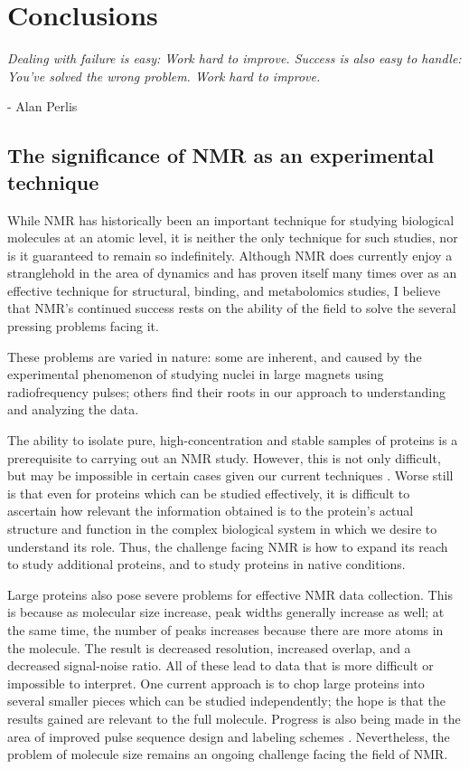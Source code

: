 \chapter{Conclusions}

\begin{center}
  \textit{Dealing with failure is easy: Work hard to improve. Success is also 
    easy to handle: You've solved the wrong problem. Work hard to improve.}

 - Alan Perlis
\end{center}

\section{The significance of NMR as an experimental technique}
While NMR has historically been an important technique for studying biological
molecules at an atomic level, it is neither the only technique for such 
studies, nor is it guaranteed to remain so indefinitely.  Although NMR does
currently enjoy a stranglehold in the area of dynamics and has proven itself
many times over as an effective technique for structural, binding, and metabolomics
studies, I believe that NMR's continued success rests on the ability of the
field to solve the several pressing problems facing it.

These problems are varied in nature: some are inherent, and caused by the 
experimental phenomenon of studying nuclei in large magnets using 
radiofrequency pulses; others find their roots in our approach to 
understanding and analyzing the data.

The ability to isolate pure, high-concentration and stable samples of proteins 
is a prerequisite to carrying out an NMR study.  However, this is not only
difficult, but may be impossible in certain cases given our current techniques
\cite{bellstedt2013resonance}.  Worse still is that even for proteins which
can be studied effectively, it is difficult to ascertain how relevant the 
information obtained is to the protein's actual structure and function in the
complex biological system in which we desire to understand its role.  Thus, 
the challenge facing NMR is how to expand its reach to study additional proteins,
and to study proteins in native conditions.

Large proteins also pose severe problems for effective NMR data collection.  
This is because as molecular size increase, peak widths generally increase as
well; at the same time, the number of peaks increases because there are more
atoms in the molecule.  The result is decreased resolution, increased overlap,
and a decreased signal-noise ratio.  All of these lead to data that is more
difficult or impossible to interpret.  One current approach is to chop large
proteins into several smaller pieces which can be studied independently; the
hope is that the results gained are relevant to the full molecule.  
Progress is also being made in the area of improved pulse sequence design
and labeling schemes \cite{tzeng2012nmr}.  Nevertheless, the problem of molecule
size remains an ongoing challenge facing the field of NMR.

